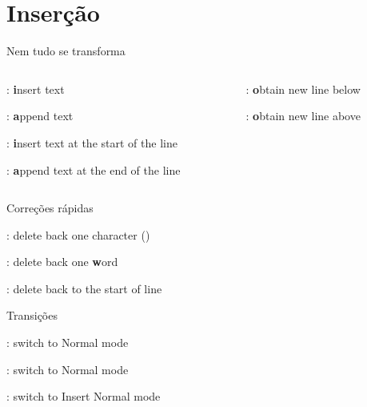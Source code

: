 \section{Inserção}
\begin{frame}{Nem tudo se transforma}
    \begin{columns}
        \begin{column}{0.6\textwidth}
            \begin{widedescription}
                \item {}: \textbf{i}nsert text
                \item {}: \textbf{a}ppend text
                \item {}: \textbf{i}nsert text at the start of the line
                \item {}: \textbf{a}ppend text at the end of the line
            \end{widedescription}
        \end{column}
        
        \begin{column}{0.4\textwidth}
            \begin{widedescription}
                \item {}: \textbf{o}btain new line below
                \item {}: \textbf{o}btain new line above
            \end{widedescription}
        \end{column}
    \end{columns}
\end{frame}

\begin{frame}{Correções rápidas}
    \begin{widedescription}
        \item {}: delete back one character ()
        \item {}: delete back one \textbf{w}ord
        \item {}: delete back to the start of line
    \end{widedescription}
\end{frame}

\begin{frame}{Transições}
    \begin{widedescription}
        \item {}: switch to Normal mode
        \item \key{\sk{C-[}}: switch to Normal mode
        \item {}: switch to Insert Normal mode
    \end{widedescription}
\end{frame}

